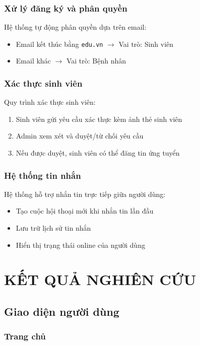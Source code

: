 \documentclass[a4paper,12pt]{report}
\begin{document}
\subsection{Xử lý đăng ký và phân quyền}

Hệ thống tự động phân quyền dựa trên email:
\begin{itemize}
    \item Email kết thúc bằng \texttt{edu.vn} $\rightarrow$ Vai trò: Sinh viên
    \item Email khác $\rightarrow$ Vai trò: Bệnh nhân
\end{itemize}

\subsection{Xác thực sinh viên}

Quy trình xác thực sinh viên:
\begin{enumerate}
    \item Sinh viên gửi yêu cầu xác thực kèm ảnh thẻ sinh viên
    \item Admin xem xét và duyệt/từ chối yêu cầu
    \item Nếu được duyệt, sinh viên có thể đăng tin ứng tuyển
\end{enumerate}

\subsection{Hệ thống tin nhắn}

Hệ thống hỗ trợ nhắn tin trực tiếp giữa người dùng:
\begin{itemize}
    \item Tạo cuộc hội thoại mới khi nhắn tin lần đầu
    \item Lưu trữ lịch sử tin nhắn
    \item Hiển thị trạng thái online của người dùng
\end{itemize}


\chapter{KẾT QUẢ NGHIÊN CỨU}

\section{Giao diện người dùng}

\subsection{Trang chủ}
\end{document}
